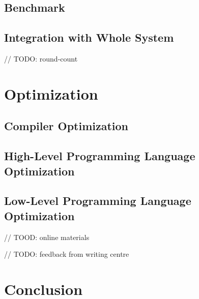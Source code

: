 \documentclass[sigconf, review=false]{acmart}
\begin{document}
\subsection{Benchmark}

\subsection{Integration with Whole System} \label{sec-int}
// TODO: round-count


\section{Optimization}

\subsection{Compiler Optimization}

\subsection{High-Level Programming Language Optimization}

\subsection{Low-Level Programming Language Optimization} \label{sec-low}
// TOOD: online materials




// TODO: feedback from writing centre

\section{Conclusion}





\end{document}
